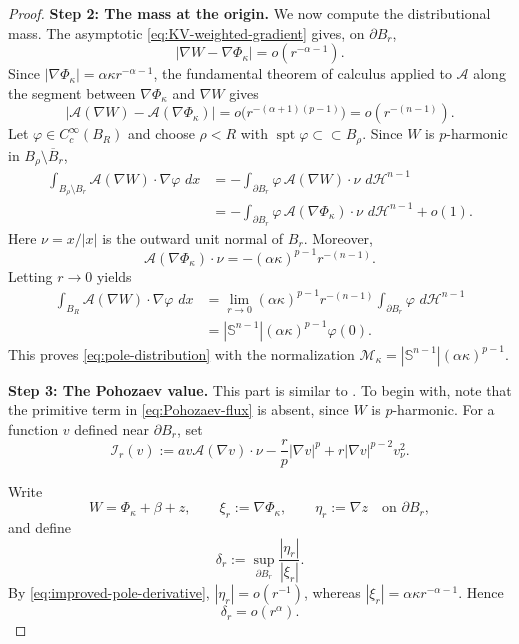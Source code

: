 \documentclass[reqno,12pt]{amsart}
\numberwithin{equation}{section}
\theoremstyle{remark}
\newcommand{\dd}{\,d}
\newcommand{\Acal}{\mathcal A}
\begin{document}
\begin{proof}
\medskip
\noindent
{\bf Step 2: The mass at the origin.}
We now compute the distributional mass.  The asymptotic
\eqref{eq:KV-weighted-gradient} gives, on $\partial B_r$,
$$
|\nabla W-\nabla\Phi_\kappa|=o(r^{-\alpha-1}).
$$
Since $|\nabla\Phi_\kappa|=\alpha\kappa r^{-\alpha-1}$, the fundamental theorem of calculus applied to $\Acal$ along the segment between $\nabla\Phi_\kappa$ and $\nabla W$ gives
$$
|\Acal(\nabla W)-\Acal(\nabla\Phi_\kappa)|
=o\bigl(r^{-(\alpha+1)(p-1)}\bigr)
=o(r^{-(n-1)}).
$$
Let $\varphi\in C_c^\infty(B_R)$ and choose $\rho<R$ with
$\operatorname{spt}\varphi\subset\subset B_\rho$.  Since $W$ is $p$-harmonic in
$B_\rho\setminus\overline B_r$,
$$
\begin{aligned}
 \int_{B_\rho\setminus B_r}\Acal(\nabla W)\cdot\nabla\varphi\,\dd x
 &=-\int_{\partial B_r}\varphi\,\Acal(\nabla W)\cdot\nu\,\dd \mathcal H^{n-1}  \\
 &=-\int_{\partial B_r}\varphi\,\Acal(\nabla\Phi_\kappa)\cdot\nu\,\dd \mathcal H^{n-1}+o(1).
\end{aligned}
$$
Here $\nu=x/|x|$ is the outward unit normal of $B_r$.  Moreover,
$$
\Acal(\nabla\Phi_\kappa)\cdot\nu =-(\alpha\kappa)^{p-1}r^{-(n-1)}.
$$
Letting $r\to 0$ yields
$$
\begin{aligned}
 \int_{B_R}\Acal(\nabla W)\cdot\nabla\varphi\,\dd x
 &=\lim_{r\to 0}(\alpha\kappa)^{p-1}r^{-(n-1)}
   \int_{\partial B_r}\varphi\,\dd \mathcal H^{n-1}  \\
 &=|\mathbb S^{n-1}|(\alpha\kappa)^{p-1}\varphi(0).
\end{aligned}
$$
This proves \eqref{eq:pole-distribution} with the normalization
$\mathcal M_\kappa=|\mathbb S^{n-1}|(\alpha\kappa)^{p-1}$.

\medskip
\noindent
{\bf Step 3: The Pohozaev value.}
This part is similar to \cite[Proposition 3.5]{QZ2026}. 
To begin with,  note that the primitive term in \eqref{eq:Pohozaev-flux} is absent, since $W$ is $p$-harmonic.  For a function $v$ defined near
$\partial B_r$, set
\begin{equation}\label{eq:defn-Ir}
\mathcal I_r(v):=a v\Acal(\nabla v)\cdot\nu
-\frac r p|\nabla v|^p +r|\nabla v|^{p-2}v_\nu^2.
\end{equation}

Write
$$
W=\Phi_\kappa+\beta+z, \qquad
\xi_r:=\nabla\Phi_\kappa, \qquad
\eta_r:=\nabla z \quad\text{on }\partial B_r,
$$
and define
$$
\delta_r:= \sup_{\partial B_r}\frac{|\eta_r|}{|\xi_r|}.
$$
By \eqref{eq:improved-pole-derivative},
$|\eta_r|=o(r^{-1})$, whereas
$|\xi_r|=\alpha\kappa r^{-\alpha-1}$.  Hence
\begin{equation}\label{eq:deltar}
\delta_r=o(r^\alpha).
\end{equation}



\end{proof}
\end{document}
